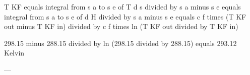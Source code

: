 T KF equals integral from s a to s e of T d s divided by s a minus s e equals integral from s a to s e of d H divided by s a minus s e equals c f times (T KF out minus T KF in) divided by c f times ln (T KF out divided by T KF in)  

298.15 minus 288.15 divided by ln (298.15 divided by 288.15) equals 293.12 Kelvin  

---